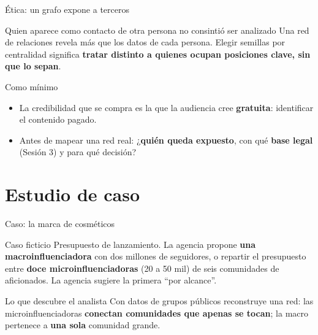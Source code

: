 \documentclass[aspectratio=169,xcolor=dvipsnames]{beamer}
\begin{document}
\begin{frame}{Ética: un grafo expone a terceros}
\begin{alertblock}{Quien aparece como contacto de otra persona no consintió ser analizado}
  Una red de relaciones revela más que los datos de cada persona. Elegir semillas por centralidad significa \textbf{tratar distinto a quienes ocupan posiciones clave, sin que lo sepan}.
\end{alertblock}
\begin{block}{Como mínimo}
  \begin{itemize}
    \item La credibilidad que se compra es la que la audiencia cree \textbf{gratuita}: identificar el contenido pagado.
    \item Antes de mapear una red real: ¿\textbf{quién queda expuesto}, con qué \textbf{base legal} (Sesión 3) y para qué decisión?
  \end{itemize}
\end{block}
\end{frame}

\section[Caso]{Estudio de caso}

\begin{frame}{Caso: la marca de cosméticos}
\begin{exampleblock}{Caso ficticio}
  Presupuesto de lanzamiento. La agencia propone \textbf{una macroinfluenciadora} con dos millones de seguidores, o repartir el presupuesto entre \textbf{doce microinfluenciadoras} (20 a 50 mil) de seis comunidades de aficionados. La agencia sugiere la primera \enquote{por alcance}.
\end{exampleblock}
\begin{alertblock}{Lo que descubre el analista}
  \small Con datos de grupos públicos reconstruye una red: las microinfluenciadoras \textbf{conectan comunidades que apenas se tocan}; la macro pertenece a \textbf{una sola} comunidad grande.
\end{alertblock}
\end{frame}
\end{document}
